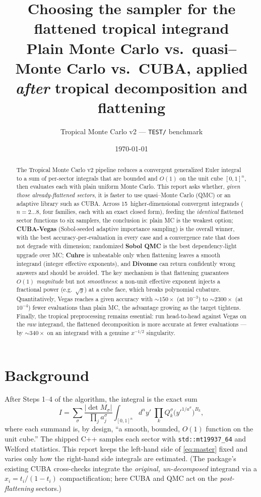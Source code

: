 \documentclass[11pt,a4paper]{article}
\title{\textbf{Choosing the sampler for the flattened tropical integrand}\\[2pt]
\large Plain Monte Carlo vs.\ quasi--Monte Carlo vs.\ CUBA, applied
\emph{after} tropical decomposition and flattening}
\author{Tropical Monte Carlo v2 --- \texttt{TEST/} benchmark}
\date{\today}
\begin{document}
\maketitle

\begin{abstract}
The Tropical Monte Carlo v2 pipeline reduces a convergent generalized Euler
integral to a sum of per-sector integrals that are bounded and $O(1)$ on the
unit cube $[0,1]^n$, then evaluates each with plain uniform Monte Carlo. This
report asks whether, \emph{given those already-flattened sectors}, it is faster
to use quasi--Monte Carlo (QMC) or an adaptive library such as CUBA. Across
15~higher-dimensional convergent integrands ($n=2\ldots 8$, four families, each
with an exact closed form), feeding the \emph{identical} flattened sector
functions to six samplers, the conclusion is: plain MC is the weakest option;
\textbf{CUBA-Vegas} (Sobol-seeded adaptive importance sampling) is the overall
winner, with the best accuracy-per-evaluation in every case and a convergence
rate that does not degrade with dimension; randomized \textbf{Sobol QMC} is the
best dependency-light upgrade over MC; \textbf{Cuhre} is unbeatable only when
flattening leaves a smooth integrand (integer effective exponents), and
\textbf{Divonne} can return confidently wrong answers and should be avoided.
The key mechanism is that flattening guarantees $O(1)$ \emph{magnitude} but not
\emph{smoothness}: a non-unit effective exponent injects a fractional power
(e.g.\ $\sqrt{y}$) at a cube face, which breaks polynomial cubature.
Quantitatively, Vegas reaches a given accuracy with ${\sim}150\times$ (at
$10^{-3}$) to ${\sim}2300\times$ (at $10^{-4}$) fewer evaluations than plain MC,
the advantage growing as the target tightens. Finally, the tropical
preprocessing remains essential: run head-to-head against Vegas on the
\emph{raw} integrand, the flattened decomposition is more accurate at fewer
evaluations --- by ${\sim}340\times$ on an integrand with a genuine $x^{-1/2}$
singularity.
\end{abstract}

\section{Background}
After Steps 1--4 of the algorithm, the integral is the exact sum
\begin{equation}\label{eq:master}
I=\sum_\sigma \frac{|\det M_\sigma|}{\prod_j a^\sigma_j}
  \int_{[0,1]^n}\!\! d^n y'\;\prod_k Q^\sigma_k\!\big({y'}^{1/a^\sigma}\big)^{B_k},
\end{equation}
where each summand is, by design, ``a smooth, bounded, $O(1)$ function on the
unit cube.'' The shipped C++ samples each sector with \texttt{std::mt19937\_64}
and Welford statistics. This report keeps the left-hand side of
\eqref{eq:master} fixed and varies only how the right-hand side integrals are
estimated. (The package's existing CUBA cross-checks integrate the
\emph{original, un-decomposed} integrand via a $x_i=t_i/(1-t_i)$
compactification; here CUBA and QMC act on the \emph{post-flattening} sectors.)
\end{document}
